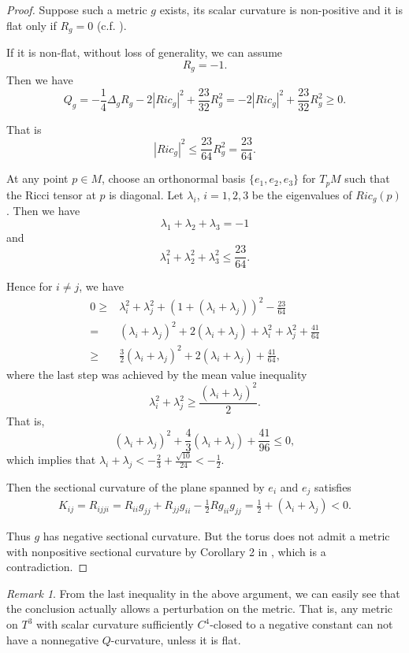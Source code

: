 \documentclass[12pt]{amsart}
\theoremstyle{definition}
\theoremstyle{remark}
\newtheorem{remark}[theorem]{Remark}
\numberwithin{equation}{section}
\begin{document}
\begin{proof}

Suppose such a metric $g$ exists, its scalar curvature is non-positive and it is flat only if $R_g = 0$ (c.f. \cite{ S-Y_1, S-Y_2, G-L_1, G-L_2}). 

If it is non-flat, without loss of generality, we can assume $$R_g = -1.$$ Then we have $$Q_g = - \frac{1}{4}\Delta_g R_g - 2 |Ric_g|^2 + \frac{23}{32} R_g^2 = - 2 |Ric_g|^2 + \frac{23}{32} R_g^2 \geq 0.$$

That is $$|Ric_g|^2 \leq \frac{23}{64}R_g^2 = \frac{23}{64}.$$

At any point $p \in M$, choose an orthonormal basis $\{e_1, e_2, e_3 \}$ for $T_p M$ such that the Ricci tensor at $p$ is diagonal. Let $\lambda_i$, $i = 1,2,3$ be the eigenvalues of $Ric_g (p)$. Then we have $$\lambda_1 + \lambda_2 + \lambda_3 = -1$$ and $$\lambda_1^2 + \lambda_2^2 + \lambda_3^2 \leq \frac{23}{64}.$$

Hence for $i \neq j$, we have
\begin{align*}
0 \geq& \lambda_i^2 + \lambda_j^2 + ( 1+ (\lambda_i + \lambda_j) )^2 - \frac{23}{64} \\
=& (\lambda_i + \lambda_j)^2 + 2 (\lambda_i + \lambda_j) + \lambda_i^2 + \lambda_j^2 + \frac{41}{64} \\
\geq &\frac{3}{2}(\lambda_i + \lambda_j)^2 + 2(\lambda_i + \lambda_j) + \frac{41}{64},
\end{align*}
where the last step was achieved by the mean value inequality $$\lambda_i^2 + \lambda_j^2 \geq \frac{(\lambda_i + \lambda_j)^2}{2} .$$
That is,
$$(\lambda_i + \lambda_j)^2 + \frac{4}{3}(\lambda_i + \lambda_j) + \frac{41}{96} \leq 0,$$
which implies that $\lambda_i + \lambda_j < - \frac{2}{3} + \frac{\sqrt{10}}{24}  < -\frac{1}{2}$.

Then the sectional curvature of the plane spanned by $e_i$ and $e_j$ satisfies
\begin{align*}
K_{ij} = R_{ijji} = R_{ii} g_{jj} + R_{jj} g_{ii} - \frac{1}{2} R g_{ii}g_{jj} = \frac{1}{2} + (\lambda_i + \lambda_j) < 0.
\end{align*}

Thus $g$ has negative sectional curvature. But the torus does not admit a metric with nonpositive sectional curvature by Corollary 2 in \cite{B-B-E}, which is a contradiction.
\end{proof}

\begin{remark}
From the last inequality in the above argument, we can easily see that the conclusion actually allows a perturbation on the metric. That is, any metric on $T^3$ with scalar curvature sufficiently $C^4$-closed to a negative constant can not have a nonnegative $Q$-curvature, unless it is flat. 
\end{remark}
\end{document}
